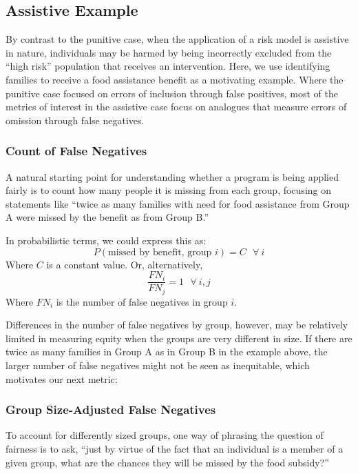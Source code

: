 \documentclass[]{krantz}
\begin{document}
\hypertarget{sec:assistiveexample}{\subsection{Assistive
Example}\label{sec:assistiveexample}}

By contrast to the punitive case, when the application of a risk model
is assistive in nature, individuals may be harmed by being incorrectly
excluded from the ``high risk'' population that receives an
intervention. Here, we use identifying families to receive a food
assistance benefit as a motivating example. Where the punitive case
focused on errors of inclusion through false positives, most of the
metrics of interest in the assistive case focus on analogues that
measure errors of omission through false negatives.

\subsubsection{Count of False Negatives}\label{count-of-false-negatives}

A natural starting point for understanding whether a program is being
applied fairly is to count how many people it is missing from each
group, focusing on statements like ``twice as many families with need
for food assistance from Group A were missed by the benefit as from
Group B.''

In probabilistic terms, we could express this as:
\[P(\textrm{missed by benefit, group $i$}) = C~~~\forall~i\] Where \(C\)
is a constant value. Or, alternatively,
\[\frac{FN_i}{FN_j} = 1~~~\forall~i,j\] Where \(FN_i\) is the number of
false negatives in group \(i\).

Differences in the number of false negatives by group, however, may be
relatively limited in measuring equity when the groups are very
different in size. If there are twice as many families in Group A as in
Group B in the example above, the larger number of false negatives might
not be seen as inequitable, which motivates our next metric:

\subsubsection{Group Size-Adjusted False
Negatives}\label{group-size-adjusted-false-negatives}

To account for differently sized groups, one way of phrasing the
question of fairness is to ask, ``just by virtue of the fact that an
individual is a member of a given group, what are the chances they will
be missed by the food subsidy?''
\end{document}
